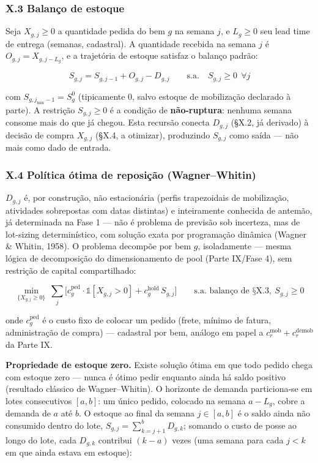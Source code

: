 \documentclass[
  10pt,
]{article}
\begin{document}
\hypertarget{x.3-balanuxe7o-de-estoque}{%
\subsubsection{X.3 Balanço de estoque}\label{x.3-balanuxe7o-de-estoque}}

Seja \(X_{g,j}\ge0\) a quantidade pedida do bem \(g\) na semana \(j\), e
\(L_g\ge0\) seu lead time de entrega (semanas, cadastral). A quantidade
recebida na semana \(j\) é \(O_{g,j}=X_{g,j-L_g}\), e a trajetória de
estoque satisfaz o balanço padrão:

\[\boxed{S_{g,j} = S_{g,j-1}+O_{g,j}-D_{g,j}}\qquad\text{s.a.}\quad S_{g,j}\ge0\ \ \forall j\]

com \(S_{g,j_{\min}-1}=S_g^0\) (tipicamente \(0\), salvo estoque de
mobilização declarado à parte). A restrição \(S_{g,j}\ge0\) é a condição
de \textbf{não-ruptura}: nenhuma semana consome mais do que já chegou.
Esta recursão conecta \(D_{g,j}\) (§X.2, já derivado) à decisão de
compra \(X_{g,j}\) (§X.4, a otimizar), produzindo \(S_{g,j}\) como saída
--- não mais como dado de entrada.

\hypertarget{x.4-poluxedtica-uxf3tima-de-reposiuxe7uxe3o-wagnerwhitin}{%
\subsubsection{X.4 Política ótima de reposição
(Wagner--Whitin)}\label{x.4-poluxedtica-uxf3tima-de-reposiuxe7uxe3o-wagnerwhitin}}

\(D_{g,j}\) é, por construção, não estacionária (perfis trapezoidais de
mobilização, atividades sobrepostas com datas distintas) e inteiramente
conhecida de antemão, já determinada na Fase 1 --- não é problema de
previsão sob incerteza, mas de lot-sizing determinístico, com solução
exata por programação dinâmica (Wagner \& Whitin, 1958). O problema
decompõe por bem \(g\), isoladamente --- mesma lógica de decomposição do
dimensionamento de pool (Parte IX/Fase 4), sem restrição de capital
compartilhado:

\[\min_{\{X_{g,j}\ge0\}}\ \sum_j\Big[c_g^{\text{ped}}\cdot\mathbb{1}[X_{g,j}>0]+c_g^{\text{hold}}\,S_{g,j}\Big]\qquad\text{s.a. balanço de §X.3},\ S_{g,j}\ge0\]

onde \(c_g^{\text{ped}}\) é o custo fixo de colocar um pedido (frete,
mínimo de fatura, administração de compra) --- cadastral por bem,
análogo em papel a \(c_r^{\text{mob}}+c_r^{\text{demob}}\) da Parte IX.

\textbf{Propriedade de estoque zero.} Existe solução ótima em que todo
pedido chega com estoque zero --- nunca é ótimo pedir enquanto ainda há
saldo positivo (resultado clássico de Wagner--Whitin). O horizonte de
demanda particiona-se em lotes consecutivos \([a,b]\): um único pedido,
colocado na semana \(a-L_g\), cobre a demanda de \(a\) até \(b\). O
estoque ao final da semana \(j\in[a,b]\) é o saldo ainda não consumido
dentro do lote, \(S_{g,j}=\sum_{k=j+1}^bD_{g,k}\); somando o custo de
posse ao longo do lote, cada \(D_{g,k}\) contribui \((k-a)\) vezes (uma
semana para cada \(j<k\) em que ainda estava em estoque):
\end{document}
